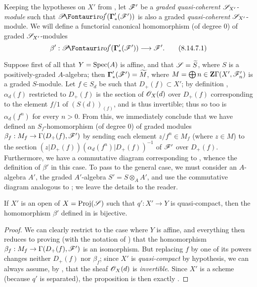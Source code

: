 \begin{env}[8.14.7]
\label{II.8.14.7}
Keeping the hypotheses on $X'$ from , let $\mathscr{F}'$ be a \emph{graded quasi-coherent $\mathscr{S}_{X'}$-module} such that $\shProj'(\boldsymbol{\Gamma}'_*(\sh{F}'))$ is also a graded \emph{quasi-coherent} $\mathscr{S}_{X'}$-module.
We will define a functorial canonical homomorphism (of degree $0$) of graded $\mathscr{S}_{X'}$-modules
\[
\label{II.8.14.7.1}
    \beta': \shProj'(\boldsymbol{\Gamma}'_*(\sh{F}')) \to \sh{F}'.
\tag{8.14.7.1}
\]

Suppose first of all that $Y=\operatorname{Spec}(A)$ is affine, and that $\mathscr{S}=\widetilde{S}$, where $S$ is a positively-graded $A$-algebra;
then $\boldsymbol{\Gamma}'_*(\mathscr{F}')=\widetilde{M}$, where $M=\bigoplus{n\in\mathbf{Z}}\Gamma(X',\mathscr{F}'_n)$ is a graded $S$-module.
Let $f\in S_d$ be such that $D_+(f)\subset X'$;
by definition , $\alpha_d(f)$ restricted to $D_+(f)$ is the section of $\mathscr{O}_X(d)$ over $D_+(f)$ corresponding to the element $f/1$ of $(S(d))_{(f)}$, and is thus invertible;
thus so too is $\alpha_d(f^n)$ for every $n>0$.
From this, we immediately conclude that we have defined an $S_f$-homomorphism (of degree $0$) of graded modules $\beta_f:M_f\to\Gamma(D_+(f),\sh{F}')$ by sending each element $z/f^n\in M_f$ (where $z\in M$) to the section $(z|D_+(f))(\alpha_d(f^n)|D_+(f))^{-1}$ of $\mathscr{F}'$ over $D_+(f)$.
Furthermore, we have a commutative diagram corresponding to , whence the definition of $\beta'$ in this case.
To pass to the general case, we must consider an $A$-algebra $A'$, the graded $A'$-algebra $S'=S\otimes_A A'$, and use the commutative diagram analogous to ;
we leave the details to the reader.
\end{env}

\begin{proposition}[8.14.8]
\label{II.8.14.8}
If $X'$ is an open of $X=\operatorname{Proj}(\mathscr{S})$ such that $q':X'\to Y$ is quasi-compact, then the homomorphism $\beta'$ defined in  is bijective.
\end{proposition}

\begin{proof}
\label{proof-II.8.14.8}
We can clearly restrict to the case where $Y$ is affine, and everything then reduces to proving (with the notation of ) that the homomorphism $\beta_f:M_f\to\Gamma(D_+(f),\sh{F}')$ is an isomorphism.
But replacing $f$ by one of its powers changes neither $D_+(f)$ nor $\beta_f$;
since $X'$ is \emph{quasi-compact} by hypothesis, we can always assume, by , that the sheaf $\mathscr{O}_X(d)$ is \emph{invertible}.
Since $X'$ is a scheme (because $q'$ is separated), the proposition is then exactly .
\end{proof}

